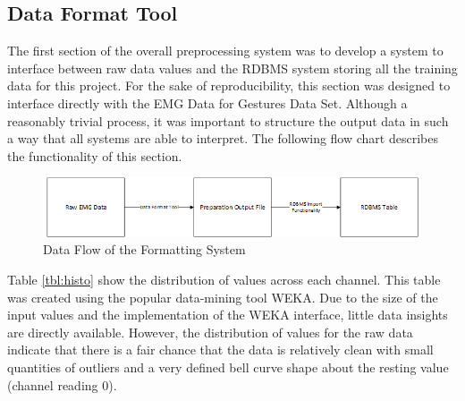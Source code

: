 \documentclass[11pt]{article}
\begin{document}
	\subsection{Data Format Tool} \label{sec:data_format}
	The first section of the overall preprocessing system was to develop a system to interface between raw data values and the RDBMS system storing all the training data for this project. For the sake of reproducibility, this section was designed to interface directly with the EMG Data for Gestures Data Set. Although a reasonably trivial process, it was important to structure the output data in such a way that all systems are able to interpret. The following flow chart describes the functionality of this section.	\\
	\begin{figure}[H]
		\centering
		\includegraphics[width=15cm]{Figures/format_system}
		\caption{Data Flow of the Formatting System}
		\label{fig:data_format}
	\end{figure}

	\noindent
	Table \ref{tbl:histo} show the distribution of values across each channel. This table was created using the popular data-mining tool WEKA. Due to the size of the input values and the implementation of the WEKA interface, little data insights are directly available. However, the distribution of values for the raw data indicate that there is a fair chance that the data is relatively clean with small quantities of outliers and a very defined bell curve shape about the resting value (channel reading 0). 
\end{document}
